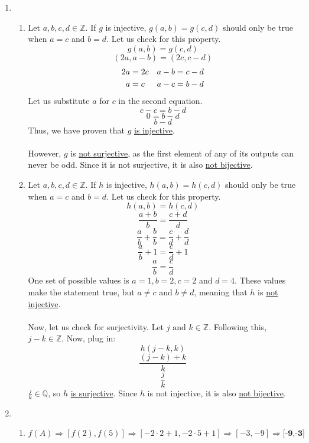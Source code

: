 \documentclass{article}
\begin{document}
\begin{enumerate}[label=\textbf{\arabic*}.]
    \item
        \begin{enumerate}[label=\textbf{\alph*}.]
            \item Let $a,b,c,d \in \mathbb{Z}$. If $g$ is injective, $g(a,b)=g(c,d)$ should only be true when $a=c$ and $b=d$. Let us check for this property.
            \[g(a,b)=g(c,d)\]
            \[(2a,a-b)=(2c,c-d)\]
            \begin{align}\notag
                2a &= 2c & a-b &= c-d \\ \notag
                a &= c & a-c &= b-d \notag
            \end{align}
            Let us substitute $a$ for $c$ in the second equation.
            \[c-c=b-d\]
            \[0=b-d\]
            \[b-d\]
            Thus, we have proven that  $g$ \underline{is injective}. \\\\ However, $g$ is \underline{not surjective}, as the first element of any of its outputs can never be odd. Since it is not surjective, it is also \underline{not bijective}.
            \item Let $a,b,c,d \in \mathbb{Z}$. If $h$ is injective, $h(a,b)=h(c,d)$ should only be true when $a=c$ and $b=d$. Let us check for this property.
            \[h(a,b)=h(c,d)\]
            \[\frac{a+b}{b}=\frac{c+d}{d}\]
            \[\frac{a}{b}+\frac{b}{b}=\frac{c}{d}+\frac{d}{d}\]
            \[\frac{a}{b}+1=\frac{c}{d}+1\]
            \[\frac{a}{b}=\frac{c}{d}\]
            One set of possible values is $a=1,b=2,c=2$ and $d=4$. These values make the statement true, but $a\neq c$ and $b\neq d$, meaning that $h$ is \underline{not injective}. \\\\ Now, let us check for surjectivity. Let $j \text{ and } k \in \mathbb{Z}$. Following this, $j-k \in \mathbb{Z}$. Now, plug in:
            \[h(j-k,k)\]
            \[\frac{(j-k)+k}{k}\]
            \[\frac{j}{k}\]
            $\frac{j}{k} \in \mathbb{Q}$, so $h$ \underline{is surjective}. Since $h$ is not injective, it is also \underline{not bijective}.
        \end{enumerate}
    \item 
        \begin{enumerate}[label=\textbf{\alph*}.]
            \item $f(A) \Rightarrow [f(2),f(5)] \Rightarrow [-2\cdot{2}+1,-2\cdot{5}+1] \Rightarrow [-3,-9] \Rightarrow \textbf{[-9,-3]}$

\end{enumerate}
\end{enumerate}
\end{document}
